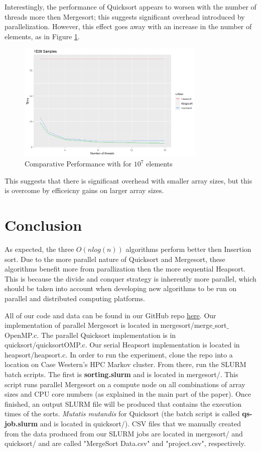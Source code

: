 \documentclass[conference]{IEEEtran}
\begin{document}
    Interestingly, the performance of Quicksort appears to worsen with the number of threads more then Mergesort; this suggests significant overhead introduced by parallelization. 
    However, this effect goes away with an increase in the number of elements, as in Figure \ref{1e8}. 
    \begin{figure}
        \includegraphics[width=9cm]{1e8.png} 
        \caption{Comparative Performance with for $10^7$ elements}
        \label{1e8}
    \end{figure}
    
    This suggests that there is significant overhead with smaller array sizes, but this is overcome by efficeicny gains on larger array sizes. 
    \section{Conclusion}
    As expected, the three $O(n log(n))$ algorithms perform better then Insertion sort. 
    Due to the more parallel nature of Quicksort and Mergesort, these algorithms benefit more from parallization then the more sequential Heapsort. 
    This is because the divide and conquer strategy is inherently more parallel, which should be taken into account when developing new algorithms to be run on parallel and distributed computing platforms. 
    
    
    \appendix
	All of our code and data can be found in our GitHub repo \href{https://github.com/causeyc/csds438_sorting}{here}. Our implementation of parallel Mergesort is located in mergesort/merge$\_$sort$\_$OpenMP.c. The parallel Quicksort implementation is in quicksort/quicksortOMP.c. Our serial Heapsort implementation is located in heapsort/heapsort.c. In order to run the experiment, clone the repo into a location on Case Western's HPC Markov cluster. From there, run the SLURM batch scripts. The first is \textbf{sorting.slurm} and is located in mergesort/. This script runs parallel Mergesort on a compute node on all combinations of array sizes and CPU core numbers (as explained in the main part of the paper). Once finished, an output SLURM file will be produced that contains the execution times of the sorts. \textit{Mutatis mutandis} for Quicksort (the batch script is called \textbf{qs-job.slurm} and is located in quicksort/). CSV files that we manually created from the data produced from our SLURM jobs are located in mergesort/ and quicksort/ and are called "MergeSort Data.csv" and "project.csv", respectively.
\end{document}
